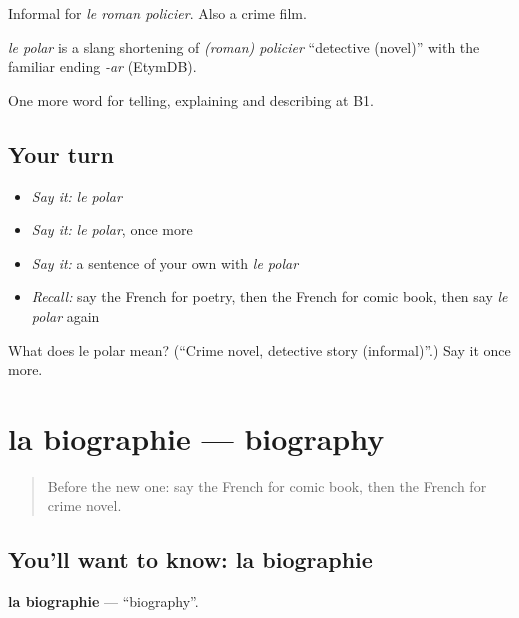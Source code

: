 Informal for \emph{le roman policier}. Also a crime film.

\begin{cousinweb}
\emph{le polar} is a slang shortening of \emph{(roman) policier} \textquotedblleft{}detective (novel)\textquotedblright{} with the familiar ending \emph{-ar} (EtymDB).
\end{cousinweb}

\begin{grammarlens}[title={What you've built}]
One more word for telling, explaining and describing at B1.
\end{grammarlens}

\subsection*{Your turn}
\begin{itemize}
\raggedright
  \item \emph{Say it:} \emph{le polar}
  \item \emph{Say it:} \emph{le polar}, once more
  \item \emph{Say it:} a sentence of your own with \emph{le polar}
  \item \emph{Recall:} say the French for poetry, then the French for comic book, then say \emph{le polar} again
\end{itemize}

\begin{tcolorbox}[breakable,colback=teal!4,colframe=teal!35!black,title={Before you move on}]
What does le polar mean? (\textquotedblleft{}Crime novel, detective story (informal)\textquotedblright{}.) Say it once more.
\end{tcolorbox}
\section[la biographie]{la biographie — biography}

\label{lesson:FR-C522-biographie}



\begin{quote}
Before the new one: say the French for comic book, then the French for crime novel.
\end{quote}

\subsection*{You'll want to know: la biographie}
\textbf{la biographie} — \textquotedblleft{}biography\textquotedblright{}.

